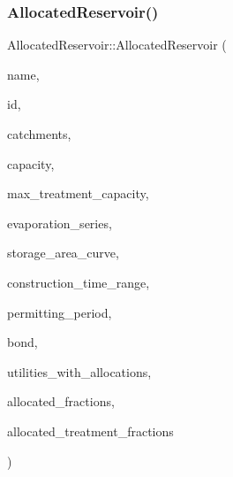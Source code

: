 \mbox{\label{classAllocatedReservoir_a22794afc1f06d13fc3099015a2250b0d_a22794afc1f06d13fc3099015a2250b0d}} 
\subsubsection{\texorpdfstring{Allocated\+Reservoir()}{AllocatedReservoir()}\hspace{0.1cm}{\footnotesize\ttfamily [2/5]}}
{\footnotesize\ttfamily Allocated\+Reservoir\+::\+Allocated\+Reservoir (\begin{DoxyParamCaption}\item[{const char $\ast$}]{name,  }\item[{const int}]{id,  }\item[{const vector$<$ \mbox{\hyperlink{classCatchment}{Catchment}} $\ast$$>$ \&}]{catchments,  }\item[{const double}]{capacity,  }\item[{const double}]{max\+\_\+treatment\+\_\+capacity,  }\item[{\mbox{\hyperlink{classEvaporationSeries}{Evaporation\+Series}} \&}]{evaporation\+\_\+series,  }\item[{\mbox{\hyperlink{classDataSeries}{Data\+Series}} $\ast$}]{storage\+\_\+area\+\_\+curve,  }\item[{const vector$<$ double $>$ \&}]{construction\+\_\+time\+\_\+range,  }\item[{double}]{permitting\+\_\+period,  }\item[{\mbox{\hyperlink{classBond}{Bond}} \&}]{bond,  }\item[{vector$<$ int $>$ $\ast$}]{utilities\+\_\+with\+\_\+allocations,  }\item[{vector$<$ double $>$ $\ast$}]{allocated\+\_\+fractions,  }\item[{vector$<$ double $>$ $\ast$}]{allocated\+\_\+treatment\+\_\+fractions }\end{DoxyParamCaption})}

\mbox{\label{classAllocatedReservoir_a17a60d40d936b1a68459d0bd9578aada_a17a60d40d936b1a68459d0bd9578aada}} 
